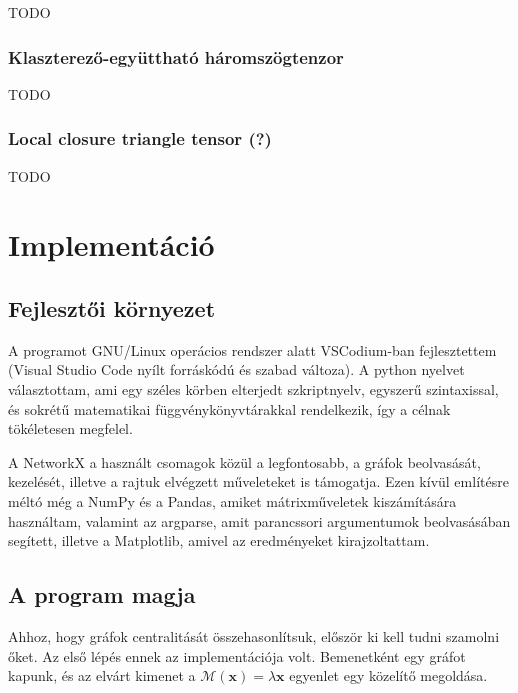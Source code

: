 \documentclass[12pt,numbers=noenddot]{report}
\begin{document}
TODO

\subsection*{Klaszterező-együttható háromszögtenzor}

TODO

\subsection*{Local closure triangle tensor (?)}

TODO



\chapter{Implementáció}

\section{Fejlesztői környezet}

A programot GNU/Linux operácios rendszer alatt VSCodium-ban fejlesztettem 
(Visual Studio Code nyílt forráskódú és szabad változa). A python nyelvet 
választottam, ami egy széles körben elterjedt szkriptnyelv, egyszerű 
szintaxissal, és sokrétű matematikai függvénykönyvtárakkal rendelkezik,
így a célnak tökéletesen megfelel.

A NetworkX a használt csomagok közül a legfontosabb, a gráfok beolvasását,
kezelését, illetve a rajtuk elvégzett műveleteket is támogatja. Ezen kívül
említésre méltó még a NumPy és a Pandas, amiket mátrixműveletek kiszámítására
használtam, valamint az argparse, amit parancssori argumentumok beolvasásában 
segített, illetve a Matplotlib, amivel az eredményeket kirajzoltattam.

\section{A program magja}

Ahhoz, hogy gráfok centralitását összehasonlítsuk, először ki kell tudni szamolni őket.
Az első lépés ennek az implementációja volt. Bemenetként egy gráfot kapunk, és az elvárt kimenet a 
$\mathcal{M}(\boldsymbol{x}) = \lambda \boldsymbol{x}$
egyenlet egy közelítő megoldása. 
\end{document}
